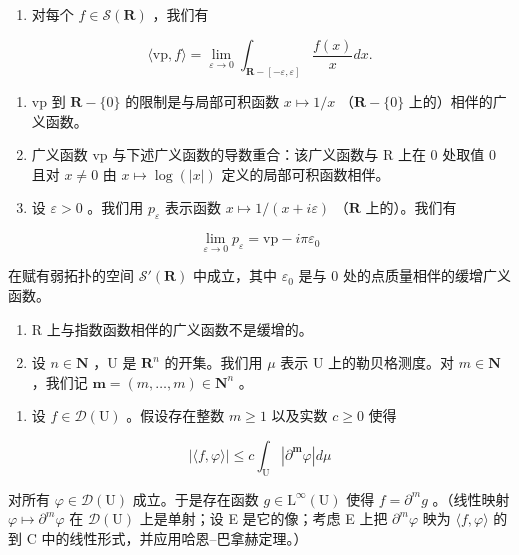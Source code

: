 \begin{enumerate}
\def\labelenumi{\alph{enumi})}
\setcounter{enumi}{1}
\tightlist
\item
  对每个 \(f \in \mathcal{S}(\mathbf{R})\) ，我们有
\end{enumerate}

\[
\langle \mathrm{vp}, f \rangle = \lim _ {\varepsilon \rightarrow 0} \int_ {\mathbf {R} - [ - \varepsilon , \varepsilon ]} \frac {f (x)}{x} d x.
\]

\begin{enumerate}
\def\labelenumi{\alph{enumi})}
\setcounter{enumi}{2}
\item
  vp 到 \(\mathbf{R} - \{0\}\) 的限制是与局部可积函数 \(x \mapsto 1/x\) （\(\mathbf{R} - \{0\}\) 上的）相伴的广义函数。
\item
  广义函数 vp 与下述广义函数的导数重合：该广义函数与 R 上在 0 处取值 0 且对 \(x \neq 0\) 由 \(x \mapsto \log(|x|)\) 定义的局部可积函数相伴。
\item
  设 \(\varepsilon > 0\) 。我们用 \(p_{\varepsilon}\) 表示函数 \(x \mapsto 1 / (x + i\varepsilon)\) （\(\mathbf{R}\) 上的）。我们有
\end{enumerate}

\[
\lim _ {\varepsilon \to 0} p _ {\varepsilon} = \mathrm{vp} - i \pi \varepsilon_ {0}
\]

在赋有弱拓扑的空间 \(\mathcal{S}'(\mathbf{R})\) 中成立，其中 \(\varepsilon_0\) 是与 0 处的点质量相伴的缓增广义函数。

\begin{enumerate}
\def\labelenumi{\arabic{enumi})}
\setcounter{enumi}{21}
\item
  R 上与指数函数相伴的广义函数不是缓增的。
\item
  设 \(n \in \mathbf{N}\) ，U 是 \(\mathbf{R}^n\) 的开集。我们用 \(\mu\) 表示 U 上的勒贝格测度。对 \(m \in \mathbf{N}\) ，我们记 \(\boldsymbol{m} = (m, \ldots, m) \in \mathbf{N}^n\) 。
\end{enumerate}

\begin{enumerate}
\def\labelenumi{\alph{enumi})}
\tightlist
\item
  设 \(f \in \mathcal{D}(\mathrm{U})\) 。假设存在整数 \(m \geqslant 1\) 以及实数 \(c \geqslant 0\) 使得
\end{enumerate}

\[
| \langle f, \varphi \rangle | \leqslant c \int_ {\mathrm{U}} | \partial^ {\boldsymbol {m}} \varphi | d \mu
\]

对所有 \(\varphi\in\mathcal{D}(\mathrm{U})\) 成立。于是存在函数 \(g\in\mathrm{L}^{\infty}(\mathrm{U})\) 使得 \(f=\partial^{m}g\) 。（线性映射 \(\varphi\mapsto\partial^{m}\varphi\) 在 \(\mathcal{D}(\mathrm{U})\) 上是单射；设 E 是它的像；考虑 E 上把 \(\partial^{m}\varphi\) 映为 \(\langle f,\varphi\rangle\) 的到 C 中的线性形式，并应用哈恩–巴拿赫定理。）

